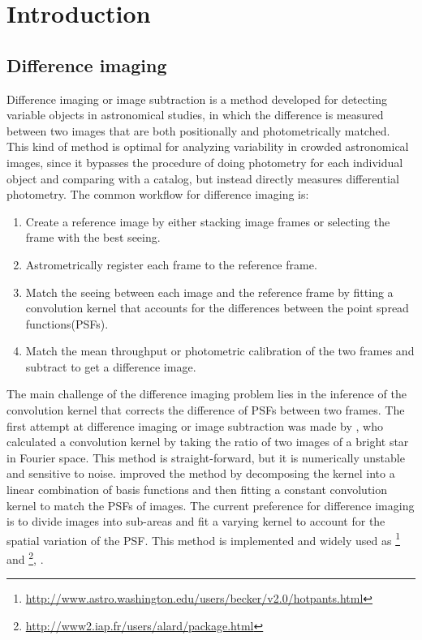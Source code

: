\section{Introduction}

\subsection{Difference imaging}
Difference imaging or image subtraction is a method developed for detecting variable objects in astronomical studies, in which the difference is measured between two images that are both positionally and photometrically matched. This kind of method is optimal for analyzing variability in crowded astronomical images, since it bypasses the procedure of doing photometry for each individual object and comparing with a catalog, but instead directly measures differential photometry.
The common workflow for difference imaging is:
\begin{enumerate}
\item
Create a reference image by either stacking image frames or selecting the frame with the best seeing.
\item
Astrometrically register each frame to the reference frame.
\item
Match the seeing between each image and the reference frame by fitting a convolution kernel that accounts for the differences between the point spread functions(PSFs).
\item
Match the mean throughput or photometric calibration of the two frames and subtract to get a difference image.
\end{enumerate}
The main challenge of the difference imaging problem lies in the inference of the convolution kernel that corrects the difference of PSFs between two frames.
The first attempt at difference imaging or image subtraction was made by \cite{imagesub1}, who calculated a convolution kernel by taking the ratio of two images of a bright star in Fourier space. 
This method is straight-forward, but it is numerically unstable and sensitive to noise.
\cite{alard} improved the method by decomposing the kernel into a linear combination of basis functions and then fitting a constant convolution kernel to match the PSFs of images.
The current preference for difference imaging \citep{varyingkernel} is to divide images into sub-areas and fit a varying kernel to account for the spatial variation of the PSF. 
This method is implemented and widely used as \footnote{\url{http://www.astro.washington.edu/users/becker/v2.0/hotpants.html}} and \footnote{\url{http://www2.iap.fr/users/alard/package.html}}, \cite{varyingkernel}. 
